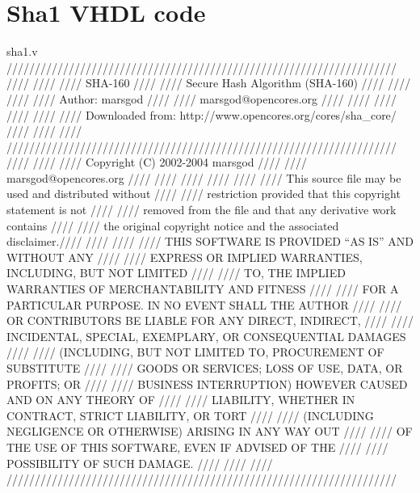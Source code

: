 \chapter{Sha1 VHDL code \cite{44}}
\begin{chunk}{sha1.v}
/////////////////////////////////////////////////////////////////////
////                                                             ////
////  SHA-160                                                    ////
////  Secure Hash Algorithm (SHA-160)                            ////
////                                                             ////
////  Author: marsgod                                            ////
////          marsgod@opencores.org                              ////
////                                                             ////
////                                                             ////
////  Downloaded from: http://www.opencores.org/cores/sha_core/  ////
////                                                             ////
/////////////////////////////////////////////////////////////////////
////                                                             ////
//// Copyright (C) 2002-2004 marsgod                             ////
////                         marsgod@opencores.org               ////
////                                                             ////
////                                                             ////
//// This source file may be used and distributed without        ////
//// restriction provided that this copyright statement is not   ////
//// removed from the file and that any derivative work contains ////
//// the original copyright notice and the associated disclaimer.////
////                                                             ////
////     THIS SOFTWARE IS PROVIDED ``AS IS'' AND WITHOUT ANY     ////
//// EXPRESS OR IMPLIED WARRANTIES, INCLUDING, BUT NOT LIMITED   ////
//// TO, THE IMPLIED WARRANTIES OF MERCHANTABILITY AND FITNESS   ////
//// FOR A PARTICULAR PURPOSE. IN NO EVENT SHALL THE AUTHOR      ////
//// OR CONTRIBUTORS BE LIABLE FOR ANY DIRECT, INDIRECT,         ////
//// INCIDENTAL, SPECIAL, EXEMPLARY, OR CONSEQUENTIAL DAMAGES    ////
//// (INCLUDING, BUT NOT LIMITED TO, PROCUREMENT OF SUBSTITUTE   ////
//// GOODS OR SERVICES; LOSS OF USE, DATA, OR PROFITS; OR        ////
//// BUSINESS INTERRUPTION) HOWEVER CAUSED AND ON ANY THEORY OF  ////
//// LIABILITY, WHETHER IN  CONTRACT, STRICT LIABILITY, OR TORT  ////
//// (INCLUDING NEGLIGENCE OR OTHERWISE) ARISING IN ANY WAY OUT  ////
//// OF THE USE OF THIS SOFTWARE, EVEN IF ADVISED OF THE         ////
//// POSSIBILITY OF SUCH DAMAGE.                                 ////
////                                                             ////
/////////////////////////////////////////////////////////////////////


\end{chunk}
